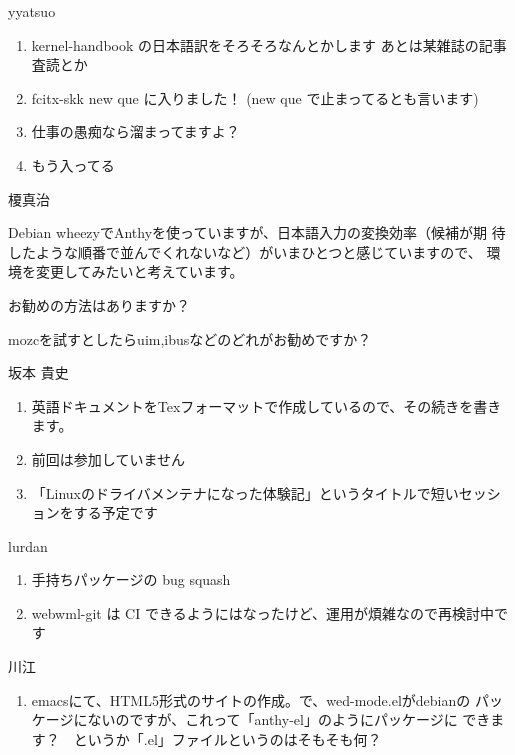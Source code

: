 \documentclass[mingoth,a4paper]{jsarticle}
\begin{document}
\begin{prework}{ yyatsuo }
  \begin{enumerate}
  \item kernel-handbook の日本語訳をそろそろなんとかします
    あとは某雑誌の記事査読とか
  \item fcitx-skk new que に入りました！
    (new que で止まってるとも言います)
  \item 仕事の愚痴なら溜まってますよ？
  \item もう入ってる
  \end{enumerate}
\end{prework}

\begin{prework}{ 榎真治 }

  Debian wheezyでAnthyを使っていますが、日本語入力の変換効率（候補が期
  待したような順番で並んでくれないなど）がいまひとつと感じていますので、
  環境を変更してみたいと考えています。

  お勧めの方法はありますか？

  mozcを試すとしたらuim,ibusなどのどれがお勧めですか？
\end{prework}

\begin{prework}{ 坂本 貴史 }
  \begin{enumerate}
  \item 英語ドキュメントをTexフォーマットで作成しているので、その続きを書きます。
  \item 前回は参加していません
  \item 「Linuxのドライバメンテナになった体験記」というタイトルで短いセッションをする予定です
  \end{enumerate}
\end{prework}

\begin{prework}{ lurdan }
  \begin{enumerate}
  \item 手持ちパッケージの bug squash
  \item webwml-git は CI できるようにはなったけど、運用が煩雑なので再検討中です
  \end{enumerate}
\end{prework}

\begin{prework}{ 川江 }
  \begin{enumerate}
  \item emacsにて、HTML5形式のサイトの作成。で、wed-mode.elがdebianの
    パッケージにないのですが、これって「anthy-el」のようにパッケージに
    できます？　というか「.el」ファイルというのはそもそも何？
  \end{enumerate}
\end{prework}
\end{document}
